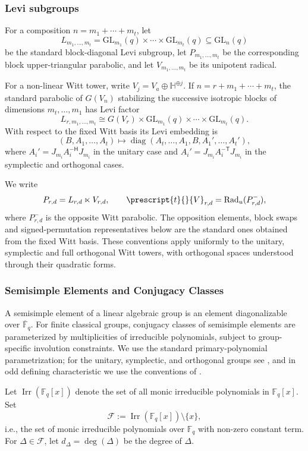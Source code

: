 \documentclass[12pt]{amsart}
\numberwithin{itemcounter}{subsection}
\theoremstyle{plain}
\theoremstyle{definition}
\theoremstyle{remark}
\numberwithin{equation}{section}
\def\bbF{\mathbb{F}}
\def\bbH{\mathbb{H}}
\def\sfT{\mathsf{T}}
\def\sfH{\mathsf{H}}
\def\calF{\mathcal{F}}
\def\Irr{{\operatorname{Irr}\nolimits}}
\def\GL{\mathrm{GL}}
\def\diag{\operatorname{diag}\nolimits}
\newcommand{\Fqb}{\overline{\mathbb{F}}_q}
\begin{document}
	\subsubsection{Levi subgroups}
For a composition $n=m_1+\cdots+m_t$, let
\[
L_{m_1,\ldots,m_t}
 =\GL_{m_1}(q)\times\cdots\times\GL_{m_t}(q)
 \subseteq\GL_n(q)
\]
be the standard block-diagonal Levi subgroup, let $P_{m_1,\ldots,m_t}$ be the
corresponding block upper-triangular parabolic, and let
$V_{m_1,\ldots,m_t}$ be its unipotent radical.

For a non-linear Witt tower, write $V_j=V_a\oplus\bbH^{\oplus j}$.  If
$n=r+m_1+\cdots+m_t$, the standard parabolic of $G(V_n)$ stabilizing the
successive isotropic blocks of dimensions $m_t,\ldots,m_1$ has Levi factor
\[
L_{r,m_1,\ldots,m_t}
 \cong G(V_r)\times\GL_{m_1}(q)\times\cdots\times\GL_{m_t}(q).
\]
With respect to the fixed Witt basis its Levi embedding is
\[
(B,A_1,\ldots,A_t)\longmapsto
\diag(A_t,\ldots,A_1,B,A_1',\ldots,A_t'),
\]
where $A_i'=J_{m_i}A_i^{-\sfH}J_{m_i}$ in the unitary case and
$A_i'=J_{m_i}A_i^{-\sfT}J_{m_i}$ in the symplectic and orthogonal cases.

We write
\[
 P_{r,d}=L_{r,d}\ltimes V_{r,d},\qquad
 \prescript{t}{}{V}_{r,d}=\operatorname{Rad}_u(P_{r,d}^{-}),
\]
where $P_{r,d}^{-}$ is the opposite Witt parabolic.  The opposition elements,
block swaps and signed-permutation representatives below are the standard ones
obtained from the fixed Witt basis.  These conventions apply uniformly to the
unitary, symplectic and full orthogonal Witt towers, with orthogonal spaces
understood through their quadratic forms.

\subsubsection{Semisimple Elements and Conjugacy Classes}
	A semisimple element of a linear algebraic group is an element diagonalizable over $\Fqb$. For finite classical groups, conjugacy classes of semisimple elements are parameterized by multiplicities of irreducible polynomials, subject to group-specific involution constraints. We use the standard primary-polynomial parametrization; for the unitary, symplectic, and orthogonal groups see \cite{Wall63}, and in odd defining characteristic we use the conventions of \cite{FS89}.

	Let $\Irr(\bbF_q[x])$ denote the set of all monic irreducible polynomials in $\bbF_q[x]$.  Set
\[
\calF := \Irr(\bbF_q[x]) \setminus \{x\},
\]	i.e., the set of monic irreducible polynomials over $\bbF_q$ with non-zero constant term. For $\Delta \in \calF$, let $d_\Delta = \deg(\Delta)$ be the degree of $\Delta$.
\end{document}
